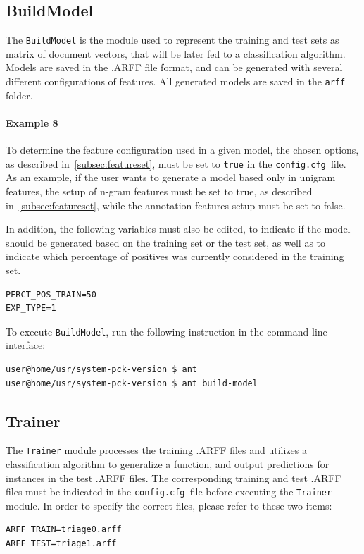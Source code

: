 \documentclass[11pt]{article}
\newcommand{\configfile}{\texttt{config.cfg{ }}}
\begin{document}
\subsection{BuildModel}
The \texttt{BuildModel} is the module used to represent the training and test sets as
matrix of document vectors, that will be later fed to a classification algorithm.
Models are saved in the .ARFF file format, and can be generated with several different configurations of features.
All generated models are saved in the \texttt{arff} folder.

\paragraph{Example 8} 
To determine the feature configuration used in a given model, 
the chosen options, as described in~\ref{subsec:featureset}, 
must be set to \texttt{true} in the \configfile file.
As an example, if the user wants to generate a model based only in unigram features,
the setup of n-gram features must be set to true, as described in~\ref{subsec:featureset},
while the annotation features setup must be set to false.

In addition, the following variables must also be edited, 
to indicate if the model should be generated based on the training set or the test set,
as well as to indicate which percentage of positives was currently considered in the training set.
\begin{lstlisting}
PERCT_POS_TRAIN=50
EXP_TYPE=1
\end{lstlisting}

To execute \texttt{BuildModel}, run the following instruction in the command line interface:
\begin{lstlisting}
user@home/usr/system-pck-version $ ant
user@home/usr/system-pck-version $ ant build-model
\end{lstlisting}

\subsection{Trainer}
The \texttt{Trainer} module processes the training .ARFF files and utilizes a classification algorithm to
generalize a function, and output predictions for instances in the test .ARFF files.
The corresponding training and test .ARFF files must be indicated 
in the \configfile file before executing the \texttt{Trainer} module.
In order to specify the correct files, please refer to these two items:
\begin{lstlisting}
ARFF_TRAIN=triage0.arff
ARFF_TEST=triage1.arff
\end{lstlisting}
\end{document}
